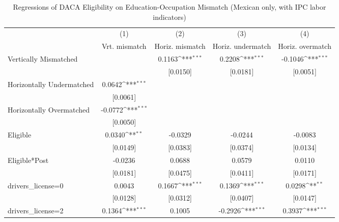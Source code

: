 \begin{table}[htbp]\centering
\def\sym#1{\ifmmode^{#1}\else\(^{#1}\)\fi}
\caption{Regressions of DACA Eligibility on Education-Occupation Mismatch (Mexican only, with IPC labor indicators)}
\begin{tabular}{l*{4}{c}}
\toprule
                    &\multicolumn{1}{c}{(1)}         &\multicolumn{1}{c}{(2)}         &\multicolumn{1}{c}{(3)}         &\multicolumn{1}{c}{(4)}         \\
                    &Vrt. mismatch         &Horiz. mismatch         &Horiz. undermatch         &Horiz. overmatch         \\
\midrule
Vertically Mismatched&                     &      0.1163\sym{***}&      0.2208\sym{***}&     -0.1046\sym{***}\\
                    &                     &    [0.0150]         &    [0.0181]         &    [0.0051]         \\
\addlinespace
Horizontally Undermatched&      0.0642\sym{***}&                     &                     &                     \\
                    &    [0.0061]         &                     &                     &                     \\
\addlinespace
Horizontally Overmatched&     -0.0772\sym{***}&                     &                     &                     \\
                    &    [0.0050]         &                     &                     &                     \\
\addlinespace
Eligible            &      0.0340\sym{**} &     -0.0329         &     -0.0244         &     -0.0083         \\
                    &    [0.0149]         &    [0.0383]         &    [0.0374]         &    [0.0134]         \\
\addlinespace
Eligible*Post       &     -0.0236         &      0.0688         &      0.0579         &      0.0110         \\
                    &    [0.0181]         &    [0.0475]         &    [0.0411]         &    [0.0171]         \\
\addlinespace
drivers\_license=0   &      0.0043         &      0.1667\sym{***}&      0.1369\sym{***}&      0.0298\sym{**} \\
                    &    [0.0128]         &    [0.0312]         &    [0.0407]         &    [0.0147]         \\
\addlinespace
drivers\_license=2   &      0.1364\sym{***}&      0.1005         &     -0.2926\sym{***}&      0.3937\sym{***}\\

\end{tabular}
\end{table}
